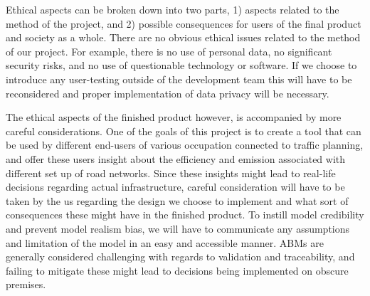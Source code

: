 
Ethical aspects can be broken down into two parts, 1) aspects related to the method of the project, and 2) possible consequences for users of the final product and society as a whole. There are no obvious ethical issues related to the method of our project. For example, there is no use of personal data, no significant security risks, and no use of questionable technology or software. If we choose to introduce any user-testing outside of the development team this will have to be reconsidered and proper implementation of data privacy will be necessary. 

The ethical aspects of the finished product however, is accompanied by more careful considerations. One of the goals of this project is to create a tool that can be used by different end-users of various occupation connected to traffic planning, and offer these users insight about the efficiency and emission associated with different set up of road networks. Since these insights might lead to real-life decisions regarding actual infrastructure, careful consideration will have to be taken by the us regarding the design we choose to implement and what sort of consequences these might have in the finished product. To instill model credibility and prevent model realism bias, we will have to communicate any assumptions and limitation of the model in an easy and accessible manner. ABMs are generally considered challenging with regards to validation and traceability\cite{abm-validation-issues}, and failing to mitigate these might lead to decisions being implemented on obscure premises. 
